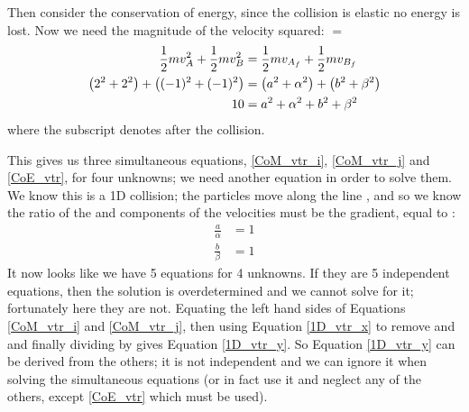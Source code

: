 \begin{problem}[A1988FMIVQ1a]
{\begin{enumerate}
Then consider the conservation of energy, since the collision is elastic no energy is lost. Now we need the magnitude of the velocity squared:  $=$ 
\begin{eqnarray} 
\frac{1}{2}mv_{A}^{2} + \frac{1}{2}mv_{B}^{2} &= \frac{1}{2}mv_{A_{f}} + \frac{1}{2}mv_{B_{f}} \notag \\ 
\left(2^{2} + 2^{2}\right) + \left((-1)^{2} + (-1)^{2}\right) &= \left(a^{2} + \alpha^{2}\right) + \left(b^{2} + \beta^{2}\right) \notag \\ 
10 &= a^{2} + \alpha^{2} + b^{2} + \beta^{2} \label{CoE_vtr} 
\end{eqnarray}
where the subscript  denotes after the collision.

This gives us three simultaneous equations, \eqref{CoM_vtr_i}, \eqref{CoM_vtr_j} and \eqref{CoE_vtr}, for four unknowns; we need another equation in order to solve them. We know this is a 1D collision; the particles move along the line , and so we know the ratio of the  and  components of the velocities must be the gradient, equal to : 
\begin{eqnarray} 
\frac{a}{\alpha} &= 1 \label{1D_vtr_x} \\ 
\frac{b}{\beta} &= 1 \label{1D_vtr_y} 
\end{eqnarray}
It now looks like we have 5 equations for 4 unknowns. If they are 5 independent equations, then the solution is overdetermined and we cannot solve for it; fortunately here they are not. Equating the left hand sides of Equations \eqref{CoM_vtr_i} and \eqref{CoM_vtr_j}, then using Equation \eqref{1D_vtr_x} to remove  and  and finally dividing by \vari{\beta} gives Equation \eqref{1D_vtr_y}. So Equation \eqref{1D_vtr_y} can be derived from the others; it is not independent and we can ignore it when solving the simultaneous equations (or in fact use it and neglect any of the others, except \eqref{CoE_vtr} which must be used).


\end{enumerate}}
\end{problem}
